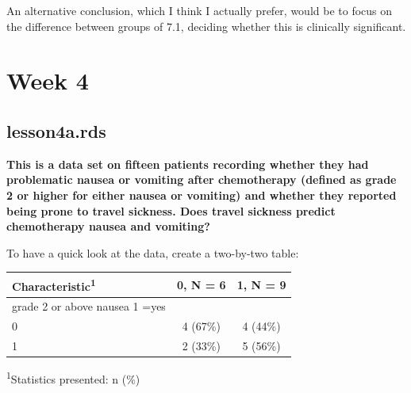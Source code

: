 \documentclass[]{book}
\newenvironment{Shaded}{\begin{snugshade}}{\end{snugshade}}
\newcommand{\DataTypeTok}[1]{\textcolor[rgb]{0.13,0.29,0.53}{#1}}
\newcommand{\KeywordTok}[1]{\textcolor[rgb]{0.13,0.29,0.53}{\textbf{#1}}}
\newcommand{\NormalTok}[1]{#1}
\newcommand{\OperatorTok}[1]{\textcolor[rgb]{0.81,0.36,0.00}{\textbf{#1}}}
\newcommand{\StringTok}[1]{\textcolor[rgb]{0.31,0.60,0.02}{#1}}
\begin{document}
An alternative conclusion, which I think I actually prefer, would be to focus on the difference between groups of 7.1, deciding whether this is clinically significant.

\hypertarget{week-4-1}{%
\section{Week 4}\label{week-4-1}}

\hypertarget{lesson4a.rds}{%
\subsection{lesson4a.rds}\label{lesson4a.rds}}

\textbf{This is a data set on fifteen patients recording whether they had problematic nausea or vomiting after chemotherapy (defined as grade 2 or higher for either nausea or vomiting) and whether they reported being prone to travel sickness. Does travel sickness predict chemotherapy nausea and vomiting?}

To have a quick look at the data, create a two-by-two table:

\begin{Shaded}
\end{Shaded}

\captionsetup[table]{labelformat=empty,skip=1pt}
\begin{longtable}{lcc}
\toprule
\textbf{Characteristic}\textsuperscript{1} & \textbf{0}, N = 6 & \textbf{1}, N = 9 \\ 
\midrule
grade 2 or above nausea 1 =yes &  &  \\ 
0 & 4 (67\%) & 4 (44\%) \\ 
1 & 2 (33\%) & 5 (56\%) \\ 
\bottomrule
\end{longtable}
\vspace{-5mm}
\begin{minipage}{\linewidth}
\textsuperscript{1}Statistics presented: n (\%) \\ 
\end{minipage}
\end{document}
